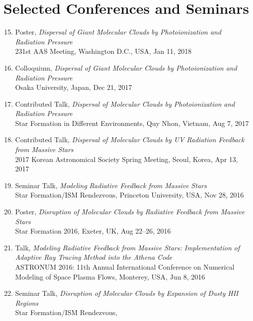 \documentclass[11pt,letterpaper,roman]{moderncv}        %
\newenvironment{benumerate}[1]{
  \let\oldItem\item
  \def\item{\addtocounter{enumi}{-2}\oldItem}
  \begin{enumerate}[itemsep=0.0mm]
    \setcounter{enumi}{#1}
    \addtocounter{enumi}{1}
  }{
  \end{enumerate}
}
\begin{document}


\section{Selected Conferences and Seminars}

\begin{benumerate}{14}
\item Poster, \textit{Dispersal of Giant Molecular Clouds by
    Photoionization and Radiation Pressure}\\ 231st AAS Meeting,
  Washington D.C., USA, Jan 11, 2018
\item Colloquium, \textit{Dispersal of Giant Molecular Clouds by
    Photoionization and Radiation Pressure}\\ Osaka University, Japan,
  Dec 21, 2017
\item Contributed Talk, \textit{Dispersal of Molecular Clouds by Photoionization
    and Radiation Pressure}\\ Star Formation in Different
  Environments, Quy Nhon, Vietnam, Aug 7, 2017
\item Contributed Talk, \textit{Dispersal of Molecular Clouds by UV
    Radiation Feedback from Massive Stars}\\ 2017 Korean Astronomical
  Society Spring Meeting, Seoul, Korea, Apr 13, 2017
\item Seminar Talk, \textit{Modeling Radiative Feedback from Massive
    Stars}\\ Star Formation/ISM Rendezvous, Princeton University, USA,
  Nov 28, 2016
\item Poster, \textit{Disruption of Molecular Clouds by Radiative
    Feedback from Massive Stars}\\ Star Formation 2016, Exeter, UK, Aug
  22--26, 2016
\item Talk, \textit{Modeling Radiative Feedback from Massive Stars:
    Implementation of Adaptive Ray Tracing Method into the Athena
    Code}\\ ASTRONUM 2016: 11th Annual International Conference on
  Numerical Modeling of Space Plasma Flows, Monterey, USA, Jun 8, 2016
\item Seminar Talk, \textit{Disruption of Molecular Clouds by
    Expansion of Dusty HII Regions}\\ Star Formation/ISM Rendezvous,

\end{benumerate}
\end{document}
